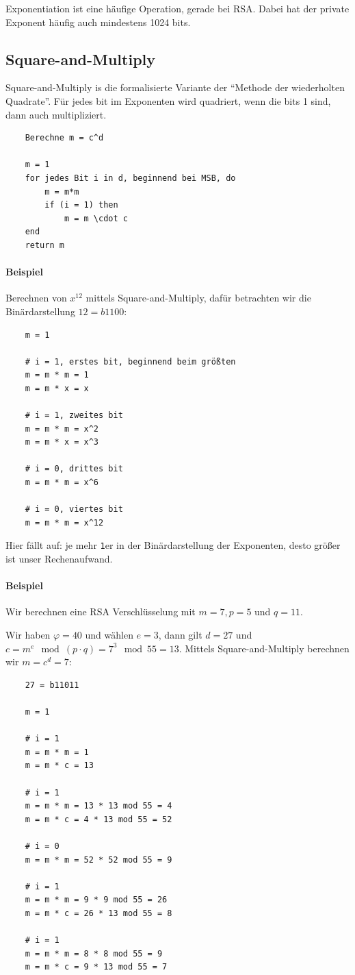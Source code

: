 Exponentiation ist eine häufige Operation, gerade bei RSA. Dabei hat der private Exponent häufig auch mindestens 1024 bits. 

\subsection{Square-and-Multiply}

Square-and-Multiply is die formalisierte Variante der ``Methode der wiederholten Quadrate''. Für jedes bit im Exponenten wird quadriert, wenn die bits 1 sind, dann 
auch multipliziert.

\begin{verbatim}
    Berechne m = c^d 

    m = 1
    for jedes Bit i in d, beginnend bei MSB, do 
        m = m*m 
        if (i = 1) then
            m = m \cdot c
    end 
    return m
\end{verbatim}

\paragraph{Beispiel} Berechnen von $x^12$ mittels Square-and-Multiply, dafür betrachten wir die Binärdarstellung $12 = b1100$:

\begin{verbatim}
    m = 1

    # i = 1, erstes bit, beginnend beim größten
    m = m * m = 1
    m = m * x = x

    # i = 1, zweites bit
    m = m * m = x^2
    m = m * x = x^3

    # i = 0, drittes bit
    m = m * m = x^6

    # i = 0, viertes bit
    m = m * m = x^12
\end{verbatim}

Hier fällt auf: je mehr \verb|1|er in der Binärdarstellung der Exponenten, desto größer ist unser Rechenaufwand.


\paragraph{Beispiel} Wir berechnen eine RSA Verschlüsselung mit $m = 7, p = 5$ und $q = 11$.

Wir haben $\varphi = 40$ und wählen $e = 3$, dann gilt $d = 27$ und $c = m^e \mod (p\cdot q) = 7^3 \mod 55 = 13$. Mittels Square-and-Multiply berechnen wir $m = c^d = 7$:

\begin{verbatim}
    27 = b11011

    m = 1

    # i = 1
    m = m * m = 1
    m = m * c = 13

    # i = 1 
    m = m * m = 13 * 13 mod 55 = 4
    m = m * c = 4 * 13 mod 55 = 52

    # i = 0
    m = m * m = 52 * 52 mod 55 = 9

    # i = 1
    m = m * m = 9 * 9 mod 55 = 26
    m = m * c = 26 * 13 mod 55 = 8 

    # i = 1 
    m = m * m = 8 * 8 mod 55 = 9
    m = m * c = 9 * 13 mod 55 = 7
\end{verbatim}

